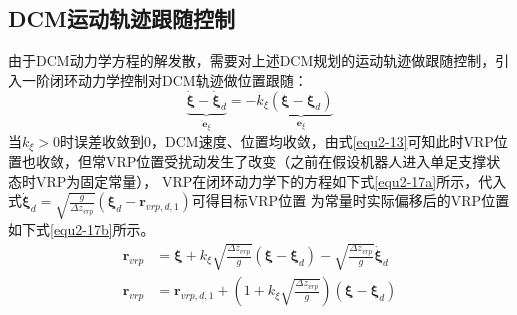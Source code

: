     \subsection{DCM运动轨迹跟随控制}
        由于DCM动力学方程的解发散，需要对上述DCM规划的运动轨迹做跟随控制，引入一阶闭环动力学控制对DCM轨迹做位置跟随：
        \begin{equation}
            \underset{\boldsymbol{\dot{e}}_{\xi}}{\underbrace{\boldsymbol{\dot{\xi}}-\boldsymbol{\dot{\xi}}_d}}=-k_{\xi}\underset{\boldsymbol{e}_{\xi}}{\underbrace{\left( \boldsymbol{\xi }-\boldsymbol{\xi }_d \right) }}
            \label{equ2-16}
        \end{equation}
        当$k_{\xi}>0$时误差收敛到0，DCM速度、位置均收敛，由式\eqref{equ2-13}可知此时VRP位置也收敛，但常VRP位置受扰动发生了改变（之前在假设机器人进入单足支撑状态时VRP为固定常量），
        VRP在闭环动力学下的方程如下式\eqref{equ2-17a}所示，代入式$\boldsymbol{\dot{\xi}}_d=\sqrt{\frac{g}{\varDelta z_{vrp}}}\left( \boldsymbol{\xi }_d-\boldsymbol{r}_{vrp,d,1} \right)$可得目标VRP位置
        为常量时实际偏移后的VRP位置如下式\eqref{equ2-17b}所示。
        \begin{subequations}
            \begin{align}
                \boldsymbol{r}_{vrp}&=\boldsymbol{\xi }+k_{\xi}\sqrt{\frac{\varDelta z_{vrp}}{g}}\left( \boldsymbol{\xi }-\boldsymbol{\xi }_d \right) -\sqrt{\frac{\varDelta z_{vrp}}{g}}\boldsymbol{\dot{\xi}}_d
                \label{equ2-17a}\\
                \boldsymbol{r}_{vrp}&=\boldsymbol{r}_{vrp,d,1}+\left( 1+k_{\xi}\sqrt{\frac{\varDelta z_{vrp}}{g}} \right) \left( \boldsymbol{\xi }-\boldsymbol{\xi }_d \right) 
                \label{equ2-17b}
            \end{align}
        \end{subequations}

